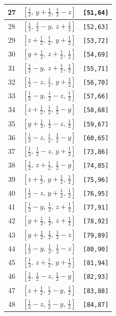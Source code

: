 \documentclass[fleqn,8pt]{jsarticle}
\begin{document}
\begin{longtable}{ccc}
27 & $\left[ \frac{1}{2},\, y + \frac{1}{2},\, \frac{1}{2} - z \right]$ & {\tt [51,64]} \\ \hline
28 & $\left[ \frac{1}{2},\, \frac{1}{2} - y,\, z + \frac{1}{2} \right]$ & {\tt [52,63]} \\ \hline
29 & $\left[ z + \frac{1}{2},\, \frac{1}{2},\, y + \frac{1}{2} \right]$ & {\tt [53,72]} \\ \hline
30 & $\left[ y + \frac{1}{2},\, z + \frac{1}{2},\, \frac{1}{2} \right]$ & {\tt [54,69]} \\ \hline
31 & $\left[ \frac{1}{2} - y,\, z + \frac{1}{2},\, \frac{1}{2} \right]$ & {\tt [55,71]} \\ \hline
32 & $\left[ \frac{1}{2} - z,\, \frac{1}{2},\, y + \frac{1}{2} \right]$ & {\tt [56,70]} \\ \hline
33 & $\left[ \frac{1}{2} - y,\, \frac{1}{2} - z,\, \frac{1}{2} \right]$ & {\tt [57,66]} \\ \hline
34 & $\left[ z + \frac{1}{2},\, \frac{1}{2},\, \frac{1}{2} - y \right]$ & {\tt [58,68]} \\ \hline
35 & $\left[ y + \frac{1}{2},\, \frac{1}{2} - z,\, \frac{1}{2} \right]$ & {\tt [59,67]} \\ \hline
36 & $\left[ \frac{1}{2} - z,\, \frac{1}{2},\, \frac{1}{2} - y \right]$ & {\tt [60,65]} \\ \hline
37 & $\left[ \frac{1}{2},\, \frac{1}{2} - z,\, y + \frac{1}{2} \right]$ & {\tt [73,86]} \\ \hline
38 & $\left[ \frac{1}{2},\, z + \frac{1}{2},\, \frac{1}{2} - y \right]$ & {\tt [74,85]} \\ \hline
39 & $\left[ z + \frac{1}{2},\, y + \frac{1}{2},\, \frac{1}{2} \right]$ & {\tt [75,96]} \\ \hline
40 & $\left[ \frac{1}{2} - z,\, y + \frac{1}{2},\, \frac{1}{2} \right]$ & {\tt [76,95]} \\ \hline
41 & $\left[ \frac{1}{2} - y,\, \frac{1}{2},\, z + \frac{1}{2} \right]$ & {\tt [77,91]} \\ \hline
42 & $\left[ y + \frac{1}{2},\, \frac{1}{2},\, z + \frac{1}{2} \right]$ & {\tt [78,92]} \\ \hline
43 & $\left[ y + \frac{1}{2},\, \frac{1}{2},\, \frac{1}{2} - z \right]$ & {\tt [79,89]} \\ \hline
44 & $\left[ \frac{1}{2} - y,\, \frac{1}{2},\, \frac{1}{2} - z \right]$ & {\tt [80,90]} \\ \hline
45 & $\left[ \frac{1}{2},\, z + \frac{1}{2},\, y + \frac{1}{2} \right]$ & {\tt [81,94]} \\ \hline
46 & $\left[ \frac{1}{2},\, \frac{1}{2} - z,\, \frac{1}{2} - y \right]$ & {\tt [82,93]} \\ \hline
47 & $\left[ z + \frac{1}{2},\, \frac{1}{2} - y,\, \frac{1}{2} \right]$ & {\tt [83,88]} \\ \hline
48 & $\left[ \frac{1}{2} - z,\, \frac{1}{2} - y,\, \frac{1}{2} \right]$ & {\tt [84,87]} \\
\end{longtable}
\end{document}
